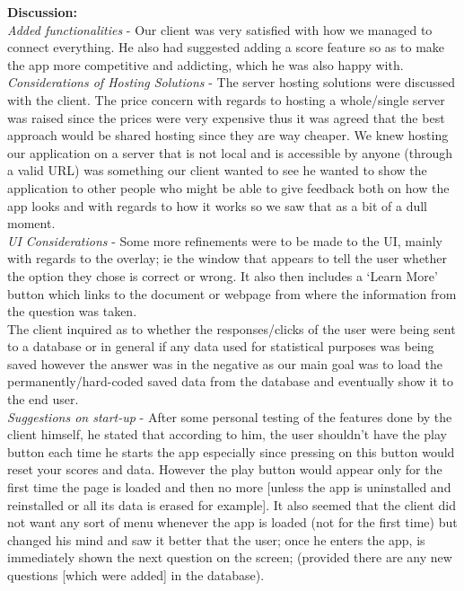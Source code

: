 \documentclass[paper=a4,fontsize=11pt]{article}
\begin{document}
\noindent
\textbf{Discussion:}\\
\noindent
\textit{Added functionalities} -
Our client was very satisfied with how we managed to connect everything. He also had
suggested adding a score feature so as to make the app more competitive and addicting,
which he was also happy with.\\

\noindent
\textit{Considerations of Hosting Solutions} -
The server hosting solutions were discussed with the client. The price concern with regards to
hosting a whole/single server was raised since the prices were very expensive thus it was
agreed that the best approach would be shared hosting since they are way cheaper. We knew
hosting our application on a server that is not local and is accessible by anyone (through a
valid URL) was something our client wanted to see he wanted to show the application to
other people who might be able to give feedback both on how the app looks and with regards
to how it works so we saw that as a bit of a dull moment.\\

\noindent
\textit{UI Considerations} -
Some more refinements were to be made to the UI, mainly with regards to the overlay; ie the
window that appears to tell the user whether the option they chose is correct or wrong. It also
then includes a ‘Learn More’ button which links to the document or webpage from where the
information from the question was taken.\\
\noindent
The client inquired as to whether the responses/clicks of the user were being sent to a
database or in general if any data used for statistical purposes was being saved however the
answer was in the negative as our main goal was to load the permanently/hard-coded saved
data from the database and eventually show it to the end user.\\

\noindent
\textit{Suggestions on start-up} -
After some personal testing of the features done by the client himself, he stated that according
to him, the user shouldn’t have the play button each time he starts the app especially since
pressing on this button would reset your scores and data. However the play button would
appear only for the first time the page is loaded and then no more [unless the app is
uninstalled and reinstalled or all its data is erased for example]. It also seemed that the client
did not want any sort of menu whenever the app is loaded (not for the first time) but changed
his mind and saw it better that the user; once he enters the app, is immediately shown the next
question on the screen; (provided there are any new questions [which were added] in the
database).\\
\end{document}
